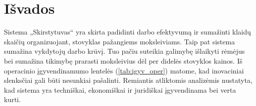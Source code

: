 \chapter{Išvados}

Sistema „Skirstytuvas“ yra skirta padidinti darbo efektyvumą ir sumažinti 
klaidų skaičių organizuojant, stovyklas pažangiems moksleiviams. Taip pat 
sistema sumažina vykdytojų darbo krūvį. Tuo pačiu suteikia galimybę 
išlaikyti rėmėjus bei sumažina tikimybę prarasti moksleivius dėl per
didelės stovyklos kainos. Iš operacinio įgyvendinamumo lentelės 
(\ref{tab:igyv_oper})
matome, kad inovaciniai slenksčiai gali būti nesunkiai pašalinti.
Remiantis atliktomis analizėmis nustatyta, kad sistema yra techniškai, 
ekonomiškai ir juridiškai įgyvendinama bei verta kurti.
